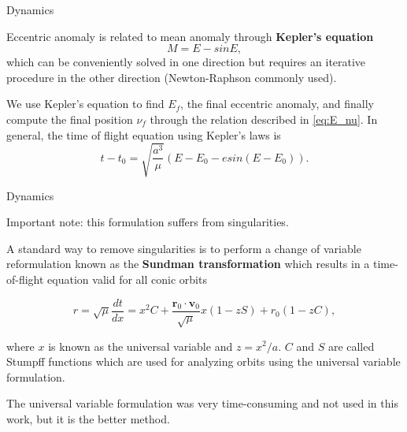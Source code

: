 \begin{frame}{Dynamics } 

    Eccentric anomaly is related to mean anomaly through \textbf{Kepler's equation} 
% 
    \begin{equation}
        M = E - sin E, 
        \label{eq:kepler_eq}
    \end{equation}
% 
    which can be conveniently solved in one direction but requires an iterative procedure in the other direction (Newton-Raphson commonly used). 
    
    We use Kepler's equation to find $E_f$, the final eccentric anomaly, and finally compute the final position $\nu_f$ through the relation described in \eqref{eq:E_nu}. 
% 
% 
    In general, the time of flight equation using Kepler's laws is  
% 
    \begin{equation}
        t - t_0 = \sqrt{ \frac{a^3}{\mu} } ( E - E_0 - e sin( E - E_0 ) ) . 
    \end{equation}
    
\end{frame} 

\begin{frame}{Dynamics}

    Important note: this formulation suffers from singularities. 

    A standard way to remove singularities is to perform a change of variable reformulation known as the \textbf{Sundman transformation} which results in a time-of-flight equation valid for all conic orbits 

    \begin{equation}
        r = \sqrt{\mu} \frac{dt}{dx} = x^2 C + \frac{ \mathbf{r}_0 \cdot \mathbf{v}_0 }{ \sqrt{\mu} } x (1 - z S) + r_0 (1 - z C) , 
    \end{equation} 

    where $x$ is known as the universal variable and $ z = x^2 / a $. $C$ and $S$ are called Stumpff functions which are used for analyzing orbits using the universal variable formulation.  


    The universal variable formulation was very time-consuming and not used in this work, but it is the better method. 
    
\end{frame} 


